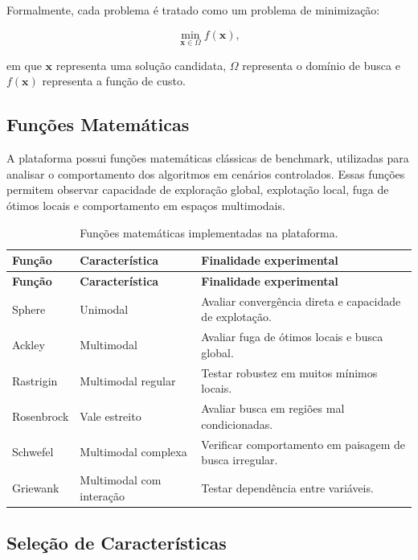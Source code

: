 Formalmente, cada problema é tratado como um problema de minimização:

\begin{equation}
    \min_{\mathbf{x} \in \Omega} f(\mathbf{x}),
\end{equation}

em que $\mathbf{x}$ representa uma solução candidata, $\Omega$ representa o domínio de busca e $f(\mathbf{x})$ representa a função de custo.

\subsection{Funções Matemáticas}

A plataforma possui funções matemáticas clássicas de benchmark, utilizadas para analisar o comportamento dos algoritmos em cenários controlados. Essas funções permitem observar capacidade de exploração global, explotação local, fuga de ótimos locais e comportamento em espaços multimodais.

\begin{longtable}{p{3.0cm} p{4.0cm} p{6.0cm}}
\caption{Funções matemáticas implementadas na plataforma.}
\label{tab:funcoes-matematicas}\\
\toprule
\textbf{Função} & \textbf{Característica} & \textbf{Finalidade experimental}\\
\midrule
\endfirsthead
\toprule
\textbf{Função} & \textbf{Característica} & \textbf{Finalidade experimental}\\
\midrule
\endhead
Sphere & Unimodal & Avaliar convergência direta e capacidade de explotação.\\
Ackley & Multimodal & Avaliar fuga de ótimos locais e busca global.\\
Rastrigin & Multimodal regular & Testar robustez em muitos mínimos locais.\\
Rosenbrock & Vale estreito & Avaliar busca em regiões mal condicionadas.\\
Schwefel & Multimodal complexa & Verificar comportamento em paisagem de busca irregular.\\
Griewank & Multimodal com interação & Testar dependência entre variáveis.\\
\bottomrule
\end{longtable}

\subsection{Seleção de Características}

